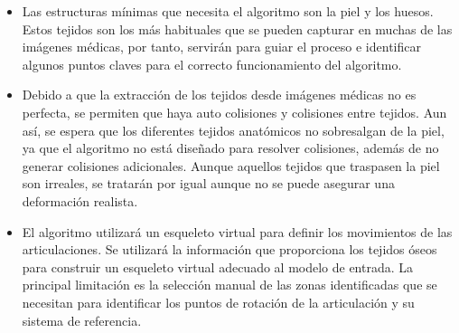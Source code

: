 \begin{itemize}
    \item Las estructuras mínimas que necesita el algoritmo son la piel y los huesos. Estos tejidos son los más habituales que se pueden capturar en muchas de las imágenes médicas, por tanto, servirán para guiar el proceso e identificar algunos puntos claves para el correcto funcionamiento del algoritmo.
    
    \item Debido a que la extracción de los tejidos desde imágenes médicas no es perfecta, se permiten que haya auto colisiones y colisiones entre tejidos. Aun así, se espera que los diferentes tejidos anatómicos no sobresalgan de la piel, ya que el algoritmo no está diseñado para resolver colisiones, además de no generar colisiones adicionales. Aunque aquellos tejidos que traspasen la piel son irreales, se tratarán por igual aunque no se puede asegurar una deformación realista.
    
    \item El algoritmo utilizará un esqueleto virtual para definir los movimientos de las articulaciones. Se utilizará la información que proporciona los tejidos óseos para construir un esqueleto virtual adecuado al modelo de entrada. La principal limitación es la selección manual de las zonas identificadas que se necesitan para identificar los puntos de rotación de la articulación y su sistema de referencia.
\end{itemize}





